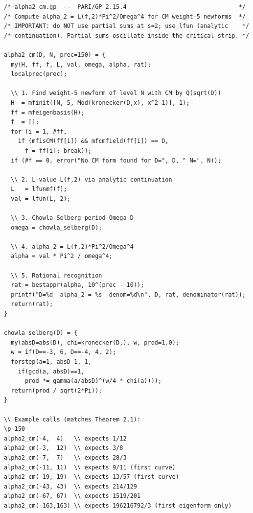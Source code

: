\documentclass[12pt]{amsart}
\theoremstyle{definition}
\begin{document}
\begin{verbatim}
/* alpha2_cm.gp  --  PARI/GP 2.15.4                                */
/* Compute alpha_2 = L(f,2)*Pi^2/Omega^4 for CM weight-5 newforms  */
/* IMPORTANT: do NOT use partial sums at s=2; use lfun (analytic    */
/* continuation). Partial sums oscillate inside the critical strip. */

alpha2_cm(D, N, prec=150) = {
  my(H, ff, f, L, val, omega, alpha, rat);
  localprec(prec);

  \\ 1. Find weight-5 newform of level N with CM by Q(sqrt(D))
  H  = mfinit([N, 5, Mod(kronecker(D,x), x^2-1)], 1);
  ff = mfeigenbasis(H);
  f  = [];
  for (i = 1, #ff,
    if (mfisCM(ff[i]) && mfcmfield(ff[i]) == D,
      f = ff[i]; break));
  if (#f == 0, error("No CM form found for D=", D, " N=", N));

  \\ 2. L-value L(f,2) via analytic continuation
  L   = lfunmf(f);
  val = lfun(L, 2);

  \\ 3. Chowla-Selberg period Omega_D
  omega = chowla_selberg(D);

  \\ 4. alpha_2 = L(f,2)*Pi^2/Omega^4
  alpha = val * Pi^2 / omega^4;

  \\ 5. Rational recognition
  rat = bestappr(alpha, 10^(prec - 10));
  printf("D=%d  alpha_2 = %s  denom=%d\n", D, rat, denominator(rat));
  return(rat);
}

chowla_selberg(D) = {
  my(absD=abs(D), chi=kronecker(D,), w, prod=1.0);
  w = if(D==-3, 6, D==-4, 4, 2);
  forstep(a=1, absD-1, 1,
    if(gcd(a, absD)==1,
      prod *= gamma(a/absD)^(w/4 * chi(a))));
  return(prod / sqrt(2*Pi));
}

\\ Example calls (matches Theorem 2.1):
\p 150
alpha2_cm(-4,  4)   \\ expects 1/12
alpha2_cm(-3,  12)  \\ expects 3/8
alpha2_cm(-7,  7)   \\ expects 28/3
alpha2_cm(-11, 11)  \\ expects 9/11 (first curve)
alpha2_cm(-19, 19)  \\ expects 13/57 (first curve)
alpha2_cm(-43, 43)  \\ expects 214/129
alpha2_cm(-67, 67)  \\ expects 1519/201
alpha2_cm(-163,163) \\ expects 196216792/3 (first eigenform only)
\end{verbatim}
\end{document}
